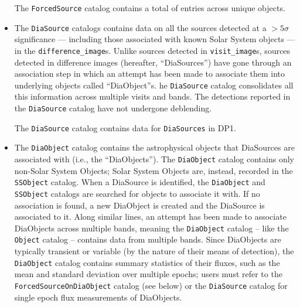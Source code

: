 \begin{itemize}
The \texttt{ForcedSource} catalog contains a total of \nforcedsources entries across \nforcedobjects unique objects.


\item The \texttt{DiaSource} catalogs \citep{10.71929/rubin/2570317} contains data on all the sources detected at a $>5\sigma$ significance --- including those associated with known Solar System objects --- in the \texttt{difference\_image}s.
Unlike sources detected in \texttt{visit\_image}s, sources detected in difference images (hereafter, ``DiaSources'') have gone through an association step in which an attempt has been made to associate them into underlying objects called ``DiaObject''s. 
he \texttt{DiaSource} catalog consolidates all this information across multiple visits and bands. 
The detections reported in the \texttt{DiaSource} catalog have not undergone deblending.

The \texttt{DiaSource} catalog contains data for \ndiasources \texttt{DiaSources} in \gls{DP1}.


\item The \texttt{DiaObject} catalog \citep{10.71929/rubin/2570319} contains the astrophysical objects that DiaSources are associated with (i.e., the ``DiaObjects'').
The \texttt{DiaObject} catalog contains only non-Solar System Objects; Solar System Objects are, instead, recorded in the \texttt{SSObject} catalog.
When a DiaSource is identified, the \texttt{DiaObject} and \texttt{SSObject} catalogs are searched for objects to associate it with.
If no association is found, a new DiaObject is created and the DiaSource is associated to it.
Along similar lines, an attempt has been made to associate DiaObjects across multiple bands, meaning the \texttt{DiaObject} catalog -- like the \texttt{Object} catalog -- contains data from multiple bands.
Since DiaObjects are typically \gls{transient} or variable (by the nature of their means of detection), the \texttt{DiaObject} catalog contains summary statistics of their fluxes, such as the mean and standard deviation over multiple epochs; users must refer to the \texttt{ForcedSourceOnDiaObject} catalog (see below) or the \texttt{DiaSource} catalog for single \gls{epoch} \gls{flux} measurements of DiaObjects.


\end{itemize}
